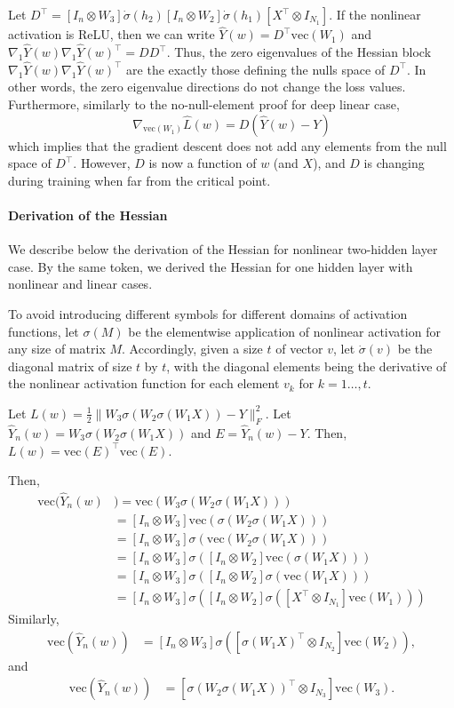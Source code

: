 \documentclass[10pt]{article}
\newcommand{\vect}{\mathrm{vec}}
\begin{document}
Let
$D^\top=[I_{n} \otimes W_{3}] \dot \sigma(h_2)[I_{n} \otimes W_{2}]
\dot \sigma(h_1) [X^\top \otimes I_{N_1}]$. If the nonlinear
activation is ReLU, then we can write $\hat Y(w)=D^{\top} \vect(W_1)$
and $\nabla_{1} \hat Y(w)\nabla_{1} \hat Y(w)^\top = DD^\top $. Thus,
the zero eigenvalues of the Hessian block
$\nabla_{1} \hat Y(w)\nabla_{1} \hat Y(w)^\top$ are the exactly those
defining the nulls space of $D^\top$. In other words, the zero
eigenvalue directions do not change the loss values. Furthermore,
similarly to the no-null-element proof for deep linear case,
$$
\nabla_{\vect(W_1)} \hat L(w) =D (\hat Y(w)-Y)  
$$ 
which implies that the gradient descent does not add any elements from the null
space of $D^\top$. However, $D$ is now a function of $w$ (and $X$), and
$D$ is changing during training when far  from the critical point.


\paragraph{Derivation of the Hessian}

We describe below the derivation of the Hessian for nonlinear two-hidden
layer case. By the same token, we derived the Hessian for one hidden
layer with nonlinear and linear cases.

To avoid introducing different symbols for different domains of
activation functions, let $\sigma(M)$ be the elementwise application
of nonlinear activation for any size of matrix $M$. Accordingly, given
a size $t$ of vector $v$, let $\dot \sigma(v)$ be the diagonal matrix
of size $t$ by $t$, with the diagonal elements being the derivative of
the nonlinear activation function for each element $v_k$ for
$k=1\dots,t$.


Let $L(w)=\frac{1}{2} \|W_3\sigma(W_2\sigma(W_1X))-Y\|^2_F$. Let $\hat Y_n(w)= W_3\sigma(W_2\sigma(W_1X))$ and $E=\hat Y_n(w)-Y$. Then, $L(w)=\vect(E)^\top \vect(E)$.    

Then, 
\begin{align*}
\vect(\hat Y_n(w) &)= \vect(W_3\sigma(W_2\sigma(W_1X)))
\\ &= [I_{n} \otimes W_{3}] \vect(\sigma(W_2\sigma(W_1X)))
\\ &= [I_{n} \otimes W_{3}] \sigma(\vect(W_2\sigma(W_1X)))
\\ &= [I_{n} \otimes W_{3}]  \sigma([I_{n} \otimes W_{2}]  \vect(\sigma(W_1X)))
\\ &=  [I_{n} \otimes W_{3}]  \sigma([I_{n} \otimes W_{2}]  \sigma(  \vect(W_1X)))
 \\ &=[I_{n} \otimes W_{3}]  \sigma([I_{n} \otimes W_{2}]  \sigma([X^\top \otimes I_{N_1}] \vect(W_1)))  
\end{align*}  
Similarly, 
\begin{align*}
\vect(\hat Y_n(w)) &=[I_{n} \otimes W_{3}] \sigma([\sigma(W_1X)^\top \otimes I_{N_2}]  \vect(W_2)), 
\end{align*}  
and
\begin{align*}
\vect(\hat Y_n(w)) &= [\sigma(W_2\sigma(W_1X))^\top \otimes I_{N_{3}}] \vect(W_3). \end{align*}  
\end{document}
